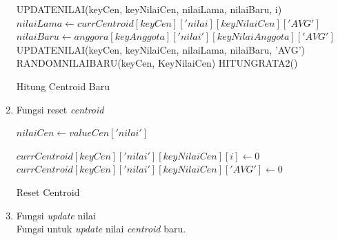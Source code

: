 \begin{enumerate}
\begin{algorithm}[H]
\begin{algorithmic}[1]
                                                \State UPDATENILAI(keyCen, keyNilaiCen, nilaiLama, nilaiBaru, i)
                                            \EndFor
                                            \State $nilaiLama \gets currCentroid[keyCen]['nilai][keyNilaiCen]['AVG']$
                                            \State $nilaiBaru \gets anggora[keyAnggota]['nilai'][keyNilaiAnggota]['AVG']$
                                            \State UPDATENILAI(keyCen, keyNilaiCen, nilaiLama, nilaiBaru, 'AVG')
                                        \EndIf
                                    \EndFor
                                \EndFor
                                \Else
                                    \State RANDOMNILAIBARU(keyCen, KeyNilaiCen)
                            \EndIf
                        \EndFor
                    \EndFor
                    \State HITUNGRATA2()
                \EndProcedure
            \end{algorithmic} 
            \caption{Hitung Centroid Baru}
            \label{alg:hitungCentroidBaru}
        \end{algorithm}
        
    \item Fungsi reset \textit{centroid} \\
        
        \begin{algorithm}[H]
            \begin{algorithmic}[1]
                        \State $nilaiCen \gets valueCen['nilai']$
                        
                                \State $currCentroid[keyCen]['nilai'][keyNilaiCen][i] \gets 0$
                            \EndFor
                            \State $currCentroid[keyCen]['nilai'][keyNilaiCen]['AVG'] \gets 0$
                        \EndFor
                    \EndFor
                \EndProcedure
            \end{algorithmic} 
            \caption{Reset Centroid}
            \label{alg:resetCentroid}
        \end{algorithm}
        
    \item Fungsi \textit{update} nilai \\
        Fungsi untuk \textit{update} nilai \textit{centroid} baru.\\
        

\end{enumerate}
